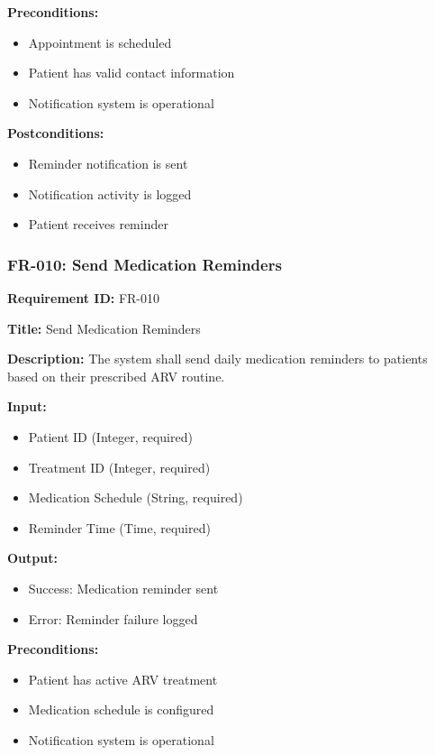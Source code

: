\documentclass[12pt,a4paper]{article}
\begin{document}
\textbf{Preconditions:}
\begin{itemize}
    \item Appointment is scheduled
    \item Patient has valid contact information
    \item Notification system is operational
\end{itemize}

\textbf{Postconditions:}
\begin{itemize}
    \item Reminder notification is sent
    \item Notification activity is logged
    \item Patient receives reminder
\end{itemize}

\subsubsection{FR-010: Send Medication Reminders}

\textbf{Requirement ID:} FR-010

\textbf{Title:} Send Medication Reminders

\textbf{Description:} The system shall send daily medication reminders to patients based on their prescribed ARV routine.

\textbf{Input:}
\begin{itemize}
    \item Patient ID (Integer, required)
    \item Treatment ID (Integer, required)
    \item Medication Schedule (String, required)
    \item Reminder Time (Time, required)
\end{itemize}

\textbf{Output:}
\begin{itemize}
    \item Success: Medication reminder sent
    \item Error: Reminder failure logged
\end{itemize}

\textbf{Preconditions:}
\begin{itemize}
    \item Patient has active ARV treatment
    \item Medication schedule is configured
    \item Notification system is operational
\end{itemize}
\end{document}
